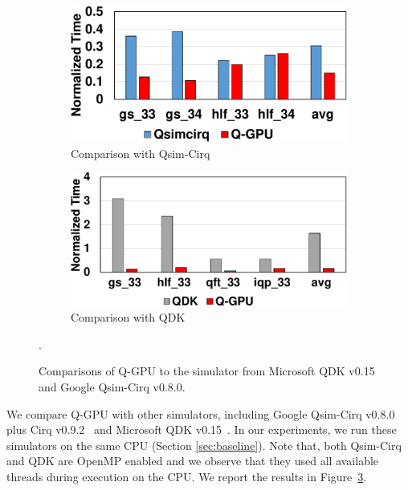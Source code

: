 \begin{figure}[h]
  \begin{subfigure}{0.5\textwidth}
    \includegraphics[width=\linewidth]{Images/appendix2/section-5/cmp-qsim.pdf}
    \caption{Comparison with Qsim-Cirq} \label{fig:qsim}
  \end{subfigure}%
\hspace{1pt}
  \begin{subfigure}{0.5\textwidth}
    \includegraphics[width=\linewidth]{Images/appendix2/section-5/cmp-qdk.pdf}
    \caption{Comparison with QDK} \label{fig:qdk}
  \end{subfigure}%
  
\caption{Comparisons of Q-GPU to the simulator from Microsoft QDK v0.15 and Google Qsim-Cirq v0.8.0.}. 
\label{fig:others}
\vspace{-5pt}
\end{figure}

We compare Q-GPU with other simulators, including Google Qsim-Cirq v0.8.0 plus Cirq v0.9.2~\cite{10.5281/zenodo.4023103} and Microsoft QDK v0.15~\cite{msqdk}. In our experiments, we run these simulators on the same CPU (Section \ref{sec:baseline}). Note that, both Qsim-Cirq and QDK are OpenMP enabled and we observe that they used all available threads during execution on the CPU. We report the results in Figure~\ref{fig:others}. 

